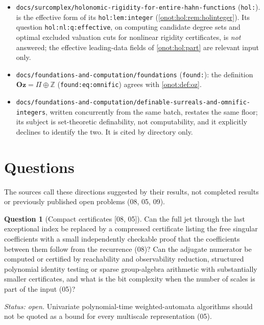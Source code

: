 \documentclass[11pt,oneside]{article}
\numberwithin{equation}{section}
\theoremstyle{definition}
\newtheorem{question}[question]{Question}
\theoremstyle{remark}
\newcommand{\Oz}{\mathbf{Oz}}
\newcommand{\Z}{\mathbb Z}
\newcommand{\src}[1]{\textup{\textsf{\small[#1]}}}
\newcommand{\replabel}[1]{\nolinkurl{#1}}
\newcommand{\fn}[1]{\nolinkurl{#1}}
\begin{document}
\begin{itemize}[leftmargin=*]
coefficients is \emph{not} addressed: the systems here decide ground equality,
order and floor, not the existence of roots; nor is \replabel{odg:q:search}. The
report is being extended concurrently from the same batch; only labels present at
the time of writing are cited.
\item \fn{docs/surcomplex/holonomic-rigidity-for-entire-hahn-functions}
(\texttt{hol:}).  is the effective form of its
\replabel{hol:lem:integer} (\cref{onot:hol:rem:holinteger}). Its question
\replabel{hol:nl:q:effective}, on computing candidate degree sets and optimal
excluded valuation cuts for nonlinear rigidity certificates, is \emph{not}
answered; the effective leading-data fields of \cref{onot:hol:part} are relevant
input only.
\item \fn{docs/foundations-and-computation/foundations} (\texttt{found:}): the
definition $\Oz=\Pi\oplus\Z$ (\replabel{found:eq:omnific}) agrees with
\cref{onot:def:oz}.
\item \fn{docs/foundations-and-computation/definable-surreals-and-omnific-integers},
written concurrently from the same batch, restates the same floor; its subject is
set-theoretic definability, not computability, and it explicitly declines to
identify the two. It is cited by directory only.
\end{itemize}

\section{Questions}\label{onot:sec:questions}

The sources call these directions suggested by their results, not completed results
or previously published open problems (08, 05, 09).

\begin{question}[Compact certificates \src{08, 05}]\label{onot:q:compact}
Can the full jet through the last exceptional index be replaced by a compressed
certificate listing the free singular coefficients with a small independently
checkable proof that the coefficients between them follow from the recurrence
(08)? Can the adjugate numerator be computed or certified by reachability and
observability reduction, structured polynomial identity testing or sparse
group-algebra arithmetic with substantially smaller certificates, and what is the
bit complexity when the number of scales is part of the input (05)?
\end{question}
\emph{Status: open.} Univariate polynomial-time weighted-automata algorithms should
not be quoted as a bound for every multiscale representation (05).
\end{document}
